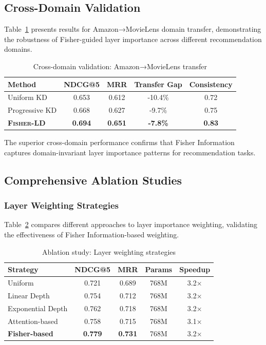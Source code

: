 \documentclass[10pt,conference]{IEEEtran}
\newcommand{\fisherld}{\textsc{Fisher-LD}}
\begin{document}
\subsection{Cross-Domain Validation}

Table~\ref{tab:cross_domain} presents results for Amazon→MovieLens domain transfer, demonstrating the robustness of Fisher-guided layer importance across different recommendation domains.

\begin{table}[t]
\centering
\caption{Cross-domain validation: Amazon→MovieLens transfer}
\label{tab:cross_domain}
\begin{tabular}{lcccc}
\toprule
Method & NDCG@5 & MRR & Transfer Gap & Consistency \\
\midrule
Uniform KD & 0.653 & 0.612 & -10.4\% & 0.72 \\
Progressive KD & 0.668 & 0.627 & -9.7\% & 0.75 \\
\textbf{\fisherld{}} & \textbf{0.694} & \textbf{0.651} & \textbf{-7.8\%} & \textbf{0.83} \\
\bottomrule
\end{tabular}
\end{table}

The superior cross-domain performance confirms that Fisher Information captures domain-invariant layer importance patterns for recommendation tasks.

\subsection{Comprehensive Ablation Studies}

\subsubsection{Layer Weighting Strategies}

Table~\ref{tab:ablation_weights} compares different approaches to layer importance weighting, validating the effectiveness of Fisher Information-based weighting.

\begin{table}[t]
\centering
\caption{Ablation study: Layer weighting strategies}
\label{tab:ablation_weights}
\begin{tabular}{lcccc}
\toprule
Strategy & NDCG@5 & MRR & Params & Speedup \\
\midrule
Uniform & 0.721 & 0.689 & 768M & 3.2× \\
Linear Depth & 0.754 & 0.712 & 768M & 3.2× \\
Exponential Depth & 0.762 & 0.718 & 768M & 3.2× \\
Attention-based & 0.758 & 0.715 & 768M & 3.1× \\
\textbf{Fisher-based} & \textbf{0.779} & \textbf{0.731} & 768M & 3.2× \\
\bottomrule
\end{tabular}
\end{table}
\end{document}
